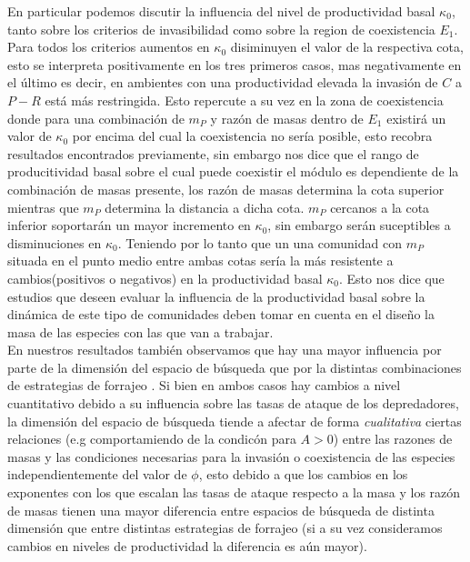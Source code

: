 En particular podemos discutir la influencia del nivel de productividad basal $\kappa_0$, tanto sobre los criterios de invasibilidad como sobre la region de coexistencia $E_1$. Para todos los criterios aumentos en $\kappa_0$ disiminuyen el valor de la respectiva cota, esto se interpreta positivamente en los tres primeros casos, mas negativamente en el \'ultimo es decir, en ambientes con una productividad elevada la invasi\'on de $C$ a $P-R$ est\'a m\'as restringida. Esto repercute a su vez en la zona de coexistencia donde para una combinaci\'on de $m_P$ y raz\'on de masas dentro de $E_1$ existir\'a un valor de $\kappa_0$ por encima del cual la coexistencia no ser\'ia posible, esto recobra resultados encontrados previamente\citep{holt1997theoretical}, sin embargo nos dice que el rango de producitividad basal sobre el cual puede coexistir el m\'odulo es dependiente de la combinaci\'on de masas presente, los raz\'on de masas determina la cota superior mientras que $m_P$ determina la distancia a dicha cota. $m_P$ cercanos a la cota inferior soportar\'an un mayor incremento en $\kappa_0$, sin embargo ser\'an suceptibles a disminuciones en $\kappa_0$. Teniendo por lo tanto que un una comunidad con $m_P$ situada en el punto medio entre ambas cotas ser\'ia la m\'as resistente a cambios(positivos o negativos) en la productividad basal $\kappa_0$. Esto nos dice que estudios que deseen evaluar la influencia de la productividad basal sobre la din\'amica de este tipo de comunidades \citep{diehl2001intraguild,takimoto2007intraguild,TP2007proximate} deben tomar en cuenta en el dise\~no la masa de las especies con las que van a trabajar.\\

En nuestros resultados tambi\'en observamos que hay una mayor influencia por parte de la dimensi\'on del espacio de b\'usqueda que por la distintas combinaciones de estrategias de forrajeo \citep{pawar2012dimensionality}. Si bien en ambos casos hay cambios a nivel cuantitativo debido a su influencia sobre las tasas de ataque de los depredadores, la dimensi\'on del espacio de b\'usqueda tiende a afectar de forma \emph{cualitativa} ciertas relaciones (e.g comportamiendo de la condic\'on para $A > 0$) entre las razones de masas y las condiciones necesarias para la invasi\'on o coexistencia de las especies independientemente del valor de $\phi$, esto debido a que los cambios en los exponentes con los que escalan las tasas de ataque respecto a la masa y los raz\'on de masas tienen una mayor diferencia entre espacios de b\'usqueda de distinta dimensi\'on que entre distintas estrategias de forrajeo (si a su vez consideramos cambios en niveles de productividad la diferencia es a\'un mayor). \\

